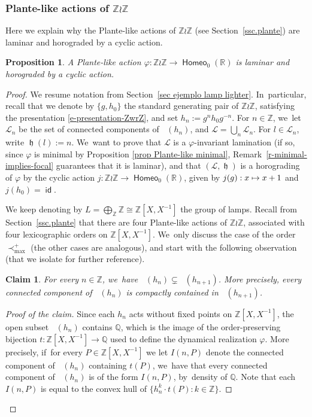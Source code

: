 \documentclass[10pt]{amsart}
\def\mto{\mathchoice{\longmapsto}{\mapsto}{\mapsto}{\mapsto}}
\newtheorem{claimnum}{Claim}
\newtheorem{prop}[thm]{Proposition}
\theoremstyle{definition}
\DeclareMathOperator{\homeo}{\mathsf{Homeo}}
\DeclareMathOperator{\hor}{\mathfrak{h}}
\DeclareMathOperator{\id}{\mathsf{id}}
\DeclareMathOperator{\suppphi}{\mathsf{Supp}^\varphi}
\newcommand{\R}{\mathbb{R}}
\newcommand{\Q}{\mathbb Q}
\newcommand{\Z}{\mathbb Z}
\newcommand{\Lcal}{\mathcal{L}}
\begin{document}
\subsubsection{Plante-like actions of $\Z \wr \Z$}
Here we explain why the Plante-like actions of $\Z \wr \Z$ (see Section~\ref{ssc.plante}) are laminar and horograded by a cyclic action.

\begin{prop}\label{prop Plante is laminar}
A Plante-like action $\varphi\colon \Z \wr \Z \to \homeo_0(\R)$ is laminar and horograded by a cyclic action.
\end{prop}

\begin{proof}
We resume notation from Section~\ref{sec ejemplo lamp lighter}. In~particular, recall that we denote by $\{g, h_0\}$ the standard generating pair of $\Z \wr \Z$, satisfying the presentation \eqref{e-presentation-ZwrZ}, and set $h_n:=g^n h_0 g^{-n}$.
For $n\in \Z$, we~let $\Lcal_n$ be the set of connected components of $\suppphi(h_n)$, and $\Lcal=\bigcup_n \Lcal_n$. For $l\in \Lcal_n$, write $\hor(l):=n$. We~want to prove that $\Lcal$ is a $\varphi$-invariant lamination (if so, since $\varphi$ is minimal by Proposition \ref{prop Plante-like minimal}, Remark~\ref{r-minimal-implies-focal} guarantees that it is laminar), and that $(\Lcal, \hor)$ is a horograding of $\varphi$ by the cyclic action $j\colon \Z \wr \Z\to \homeo_0(\R)$, given by $j(g):x\mto x+1$ and $j(h_0)=\id$.

We keep denoting by $L=\bigoplus_\Z \Z\cong \Z[X, X^{-1}]$ the group of lamps.
Recall from Section~\ref{ssc.plante} that there are four Plante-like actions of $\Z \wr \Z$, associated with four lexicographic orders on $\Z[X, X^{-1}]$. We~only discuss the case of the order $\prec_{\max}^+$ (the other cases are analogous), and start with the following observation (that we isolate for further reference).

\begin{claimnum} \label{l-plante-fixed-points}
For every $n\in \Z$, we~have $\suppphi(h_n)\subsetneq \suppphi(h_{n+1})$. More precisely, every connected component of $\suppphi(h_n)$ is compactly contained in $\suppphi(h_{n+1})$.
\end{claimnum}
\setcounter{claimnum}{0}
\begin{proof}[Proof of the claim]
Since each $h_n$ acts without fixed points on $\Z[X,X^{-1}]$, the open subset $\suppphi(h_n)$ contains $\Q$, which is the image of the order-preserving bijection $t\colon \Z[X,X^{-1}]\to \Q$ used to define the dynamical realization $\varphi$. More precisely, if~for every $P\in \Z[X, X^{-1}]$ we let $I(n, P)$ denote the connected component of $\suppphi(h_n)$ containing $t(P)$, we~have that every connected component of $\suppphi(h_n)$ is of the form $I(n, P)$, by~density of $\Q$. Note that each $I(n, P)$ is equal to the convex hull of $\{h_n^k\cdot t(P): k\in \Z\}$.


\end{proof}
\end{proof}
\end{document}
